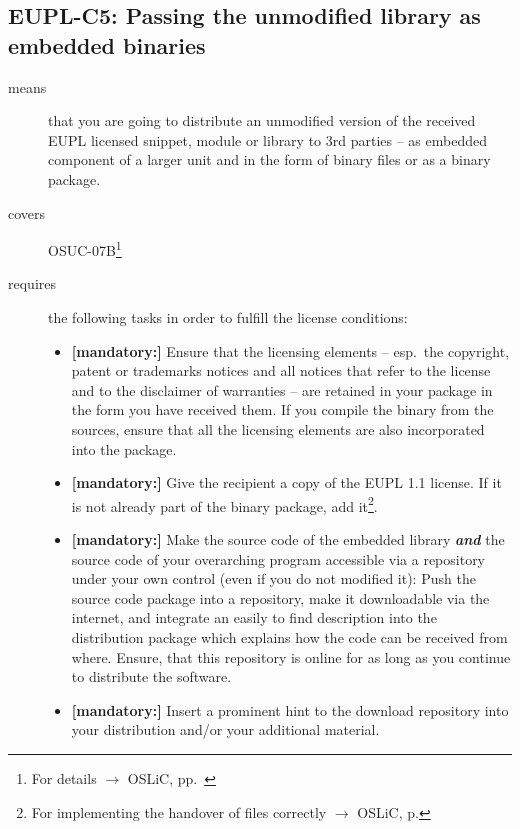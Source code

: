 \subsection{EUPL-C5: Passing the unmodified library as embedded binaries} 
\label{OSUC-07B-EUPL}

\begin{description}
\item[means] that you are going to distribute an unmodified version of the
received EUPL licensed snippet, module or library to 3rd parties -- as embedded
component of a larger unit and in the form of binary files or as a bi\-na\-ry
package.

\item[covers] OSUC-07B\footnote{For details $\rightarrow$
OSLiC, pp.\ \pageref{OSUC-07B-DEF}}

\item[requires] the following tasks in order to fulfill the license conditions:
\begin{itemize}
  
  \item \textbf{[mandatory:]} Ensure that the licensing elements -- esp.\ the
  copyright, patent or trademarks notices and all notices that refer to the
  license and to the disclaimer of warranties -- are retained in your package in
  the form you have received them. If you compile the binary from the sources,
  ensure that all the licensing elements are also incorporated into the package.
  
  \item \textbf{[mandatory:]} Give the recipient a copy of the EUPL 1.1
  license. If it is not already part of the binary package, add
  it\footnote{For implementing the handover of files correctly $\rightarrow$
  OSLiC, p. \pageref{DistributingFilesHint}}.

  \item \textbf{[mandatory:]} Make the source code of the embedded library
  \textbf{\emph{and}} the source code of your overarching program accessible via
  a repository under your own control (even if you do not modified it): Push the
  source code package into a repository, make it downloadable via the internet,
  and integrate an easily to find description into the distribution package
  which explains how the code can be received from where. Ensure, that this
  repository is online for as long as you continue to distribute the software.
  
  \item \textbf{[mandatory:]} Insert a prominent hint to the download repository
  into your distribution and/or your additional material.
  

\end{itemize}
\end{description}
